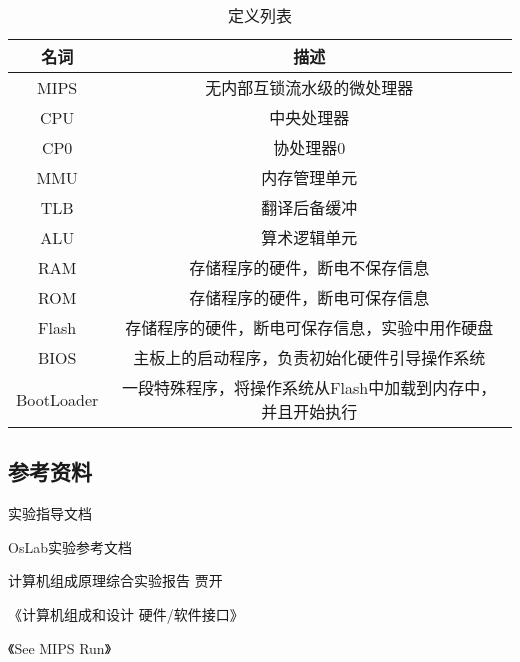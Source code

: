         \begin{table}[!hbp]
        \centering
        \caption{定义列表}
        \begin{tabular}{|c|c|}
        \hline
        名词 & 描述 \\
        \hline
        MIPS & 无内部互锁流水级的微处理器 \\
        \hline
        CPU &  中央处理器\\
        \hline
        CP0 & 协处理器0 \\
        \hline
        MMU & 内存管理单元 \\
        \hline
        TLB & 翻译后备缓冲 \\
        \hline
        ALU & 算术逻辑单元 \\
        \hline
        RAM & 存储程序的硬件，断电不保存信息 \\
        \hline
        ROM & 存储程序的硬件，断电可保存信息 \\
        \hline
        Flash & 存储程序的硬件，断电可保存信息，实验中用作硬盘 \\
        \hline
        BIOS & 主板上的启动程序，负责初始化硬件引导操作系统 \\
        \hline
        BootLoader & 一段特殊程序，将操作系统从Flash中加载到内存中，并且开始执行 \\
        \hline
        \end{tabular}
        \end{table}

    \subsection{参考资料}
        实验指导文档

        OsLab实验参考文档

        计算机组成原理综合实验报告 贾开

        《计算机组成和设计 硬件/软件接口》

        《See MIPS Run》


